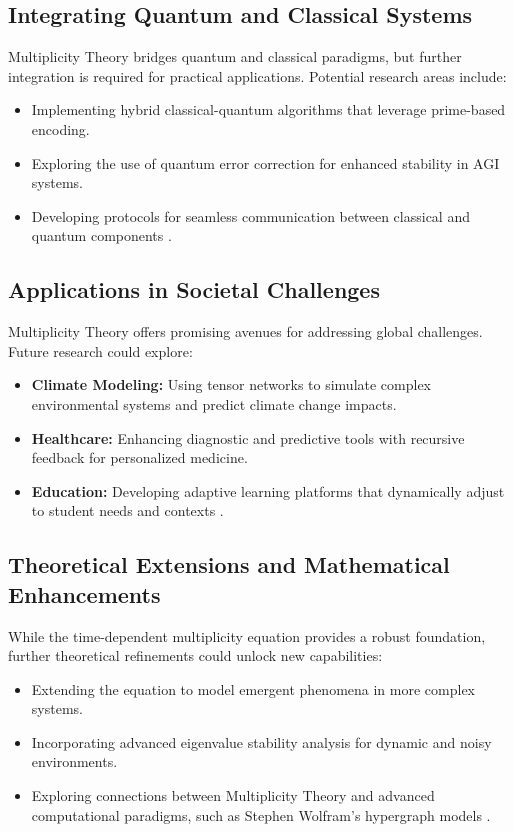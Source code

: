 \documentclass{article}
\theoremstyle{plain}
\begin{document}
\subsection{Integrating Quantum and Classical Systems}
Multiplicity Theory bridges quantum and classical paradigms, but further integration is required for practical applications. Potential research areas include:
\begin{itemize}
    \item Implementing hybrid classical-quantum algorithms that leverage prime-based encoding.
    \item Exploring the use of quantum error correction for enhanced stability in AGI systems.
    \item Developing protocols for seamless communication between classical and quantum components \cite{shor1999algorithms}.
\end{itemize}

\subsection{Applications in Societal Challenges}
Multiplicity Theory offers promising avenues for addressing global challenges. Future research could explore:
\begin{itemize}
    \item \textbf{Climate Modeling:} Using tensor networks to simulate complex environmental systems and predict climate change impacts.
    \item \textbf{Healthcare:} Enhancing diagnostic and predictive tools with recursive feedback for personalized medicine.
    \item \textbf{Education:} Developing adaptive learning platforms that dynamically adjust to student needs and contexts \cite{wolfram2020hypergraph}.
\end{itemize}

\subsection{Theoretical Extensions and Mathematical Enhancements}
While the time-dependent multiplicity equation provides a robust foundation, further theoretical refinements could unlock new capabilities:
\begin{itemize}
    \item Extending the equation to model emergent phenomena in more complex systems.
    \item Incorporating advanced eigenvalue stability analysis for dynamic and noisy environments.
    \item Exploring connections between Multiplicity Theory and advanced computational paradigms, such as Stephen Wolfram’s hypergraph models \cite{wolfram2020hypergraph}.
\end{itemize}
\end{document}
